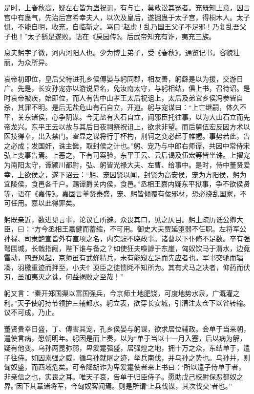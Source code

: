 \documentclass[]{article}
\begin{document}
是时，上春秋高，疑左右皆为蛊祝诅，有与亡，莫敢讼其冤者。充既知上意，因言宫中有蛊气，先治后宫希幸夫人，以次及皇后，遂掘蛊于太子宫，得桐木人。太子惧，不能自明，收充，自临斩之。骂曰``赵虏！乱乃国王父子不足邪！乃复乱吾父子也！''太子繇是遂败。语在《戾园传》。后武帝知充有诈，夷充三族。

息夫躬字子微，河内河阳人也。少为博士弟子，受《春秋》，通览记书。容貌壮丽，为众所异。

哀帝初即位，皇后父特进孔乡侯傅晏与躬同郡，相友善，躬繇是以为援，交游日广。先是，长安孙宠亦以游说显名，免汝南太守，与躬相结，俱上书，召待诏。是时哀帝被疾，始即位，而人有告中山孝王太后祝诅上，太后及弟宜乡侯冯参皆自杀，其罪不明。是后无盐危山有石自立，开道。躬与宠谋曰：``上亡继嗣，体久不平，关东诸侯，心争阴谋。今无盐有大石自立，闻邪臣托往事，以为大山石立而先帝龙兴。东平王云以故与其后日夜祠祭祝诅上，欲求非望。而后舅伍宏反因方术以医技得幸，出入禁门。霍显之谋将行于杯杓，荆轲之变必起于帷幄。事势若此，告之必成；发国奸，诛主雠，取封侯之计也。''躬、宠乃与中郎右师谭，共因中常侍宋弘上变事告焉。上恶之，下有司案验，东平王云、云后谒及伍宏等皆坐诛。上擢宠为南阳太守，谭颍川都尉，弘、躬皆光禄大夫、左曹、给事中。是时，侍中董贤爱幸，上欲侯之，遂下诏云：``躬、宠因贤以闻，封贤为高安侯，宠为方阳侯，躬为宜陵侯，食邑各千户。赐谭爵关内侯，食邑。''丞相王嘉内疑东平狱事，争不欲侯贤等，语在《嘉传》。嘉固言董贤泰盛，宠、躬皆倾覆有佞邪材，恐必挠乱国家，不可任用。嘉以此得罪矣。

躬既亲近，数进见言事，论议亡所避。众畏其口，见之仄目。躬上疏历诋公卿大臣，曰：``方今丞相王嘉健而蓄缩，不可用。御史大夫贾延堕弱不任职。左将军公孙禄、司隶鲍宣皆外有直项之名，内实騃不晓政事。诸曹以下仆脩不足数。卒有强弩围城，长戟指阙，陛下谁与备之？如使狂夫嘄謼于东崖，匈奴饮马于渭水，边竟雷动，四野风起，京师虽有武蜂精兵，未有能窥左足而先应者也。军书交驰而辐凑，羽檄重迹而押至，小夫忄耎臣之徒愦眊不知所为。其有犬马之决者，仰药而伏刃，虽加夷灭之诛，何益祸败之至哉！''

躬又言：``秦开郑国渠以富国强兵，今京师土地肥饶，可度地势水泉，广溉灌之利。''天子使躬持节领护三辅都水。躬立表，欲穿长安城，引漕注太仓下以省转输。议不可成，乃止。

董贤贵幸日盛，丁、傅害其宠，孔乡侯晏与躬谋，欲求居位辅政。会单于当来朝，遣使言病，愿朝明年。躬因是而上奏，以为``单于当以十一月入塞，后以病为解，疑有他变。乌孙两昆弥弱，卑爰疐强盛，居强煌之地，拥十万之众，东结单于，遣子往侍。如因素强之威，循乌孙就屠之迹，举兵南伐，并乌孙之势也。乌孙并，则匈奴盛，而西域危矣。可令降胡诈为卑爰疐使者来上书曰：`所以遣子侍单于者，非亲信之也，实畏之耳。唯天子哀，告单于归臣侍子。愿助戊己校尉保恶都奴之界。'因下其章诸将军，今匈奴客闻焉。则是所谓`上兵伐谋，其次伐交'者也。''
\end{document}

